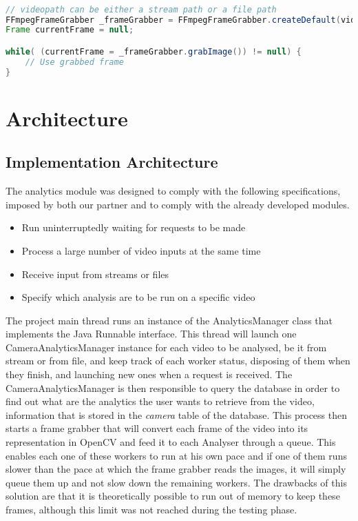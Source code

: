 \begin{lstlisting}[float,language=Java, label=src:ffmpegframegrabber, caption=FFmpegFrameGrabber usage example] 

// videopath can be either a stream path or a file path
FFmpegFrameGrabber _frameGrabber = FFmpegFrameGrabber.createDefault(videopath);
Frame currentFrame = null;

while( (currentFrame = _frameGrabber.grabImage()) != null) {
	// Use grabbed frame
}

\end{lstlisting}

\section{Architecture}

\subsection{Implementation Architecture}


The analytics module was designed to comply with the following specifications, imposed by both our partner and to comply with the already developed modules. 

\begin{itemize}
	\item Run uninterruptedly waiting for requests to be made
	\item Process a large number of video inputs at the same time
	\item Receive input from streams or files
	\item Specify which analysis are to be run on a specific video
\end{itemize}

The project main thread runs an instance of the AnalyticsManager class that implements the Java Runnable interface. This thread will launch one CameraAnalyticsManager instance for each video to be analysed, be it from stream or from file, and keep track of each worker status, disposing of them when they finish, and launching new ones when a request is received. The CameraAnalyticsManager is then responsible to query the database in order to find out what are the analytics the user wants to retrieve from the video, information that is stored in the \textit{camera} table of the database. This process then starts a frame grabber that will convert each frame of the video into its representation in OpenCV and feed it to each Analyser through a queue. This enables each one of these workers to run at his own pace and if one of them runs slower than the pace at which the frame grabber reads the images, it will simply queue them up and not slow down the remaining workers. The drawbacks of this solution are that it is theoretically possible to run out of memory to keep these frames, although this limit was not reached during the testing phase.

